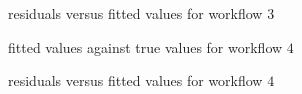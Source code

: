 \documentclass{article}
\begin{document}
\begin{figure}[!htbp]
\centering
{}
\caption{residuals versus fitted values for workflow $3$} \label{1d_32}
\end{figure}

\begin{figure}[!htbp]
\centering
{}
\caption{fitted values against true values for workflow $4$} \label{1d_41}
\end{figure}

\begin{figure}[!htbp]
\centering
{}
\caption{residuals versus fitted values for workflow $4$} \label{1d_42}
\end{figure}
\end{document}
